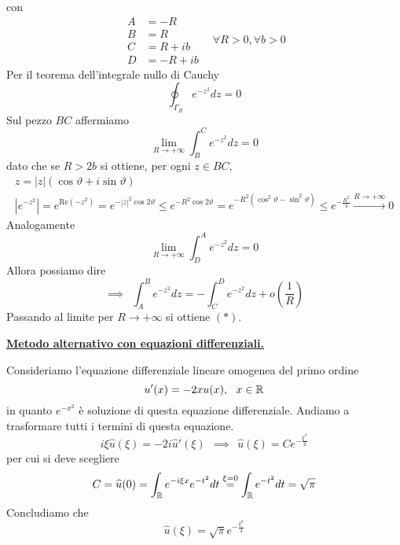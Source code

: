 con
\begin{equation*}
\begin{aligned}
A & =-R\\
B & =R\\
C & =R+ib\\
D & =-R+ib
\end{aligned} \ \ \ \ \forall R >0,\forall b >0
\end{equation*}
Per il teorema dell'integrale nullo di Cauchy
\begin{equation*}
\oint _{\Gamma _{R}} e^{-z^{2}} dz=0
\end{equation*}
Sul pezzo $BC$ affermiamo
\begin{equation*}
\lim\limits _{R\rightarrow +\infty }\int ^{C}_{B} e^{-z^{2}} dz=0
\end{equation*}
dato che se $R >2b$ si ottiene, per ogni $z\in BC$,
\begin{gather*}
z=| z| (\cos \vartheta +i\sin \vartheta )\\
\left| e^{-z^{2}}\right| =e^{\mathrm{Re}\left( -z^{2}\right)} =e^{-| z| ^{2}\cos 2\vartheta } \leqslant e^{-R^{2}\cos 2\vartheta } =e^{-R^{2}\left(\cos^{2} \vartheta -\sin^{2} \vartheta \right)} \leqslant e^{-\frac{R^{2}}{4}}\xrightarrow{R\rightarrow +\infty } 0
\end{gather*}
Analogamente
\begin{equation*}
\lim\limits _{R\rightarrow +\infty }\int ^{A}_{D} e^{-z^{2}} dz=0
\end{equation*}
Allora possiamo dire
\begin{equation*}
\implies \ \ \int ^{B}_{A} e^{-z^{2}} dz=-\int ^{D}_{C} e^{-z^{2}} dz+o\left(\frac{1}{R}\right)
\end{equation*}
Passando al limite per $R\rightarrow +\infty $ si ottiene $( *)$.



\underline{\textbf{Metodo alternativo con equazioni differenziali.}}

Consideriamo l'equazione differenziale lineare omogenea del primo ordine
\begin{equation*}
u'( x) =-2xu( x) ,\ \ x\in \mathbb{R} 
\end{equation*}
in quanto $e^{-x^{2}}$ è soluzione di questa equazione differenziale. Andiamo a trasformare tutti i termini di questa equazione.
\begin{equation*}
i\xi \hat{u}( \xi ) =-2i\hat{u} '( \xi ) \ \ \implies \ \ \hat{u}( \xi ) =Ce^{-\frac{\xi ^{2}}{4}}
\end{equation*}
per cui si deve scegliere
\begin{equation*}
C=\widehat{u}( 0) =\int _{\mathbb{R} } e^{-i\xi x} e^{-t^{2}} dt\overset{\xi =0}{=}\int _{\mathbb{R} } e^{-t^{2}} dt=\sqrt{\pi }
\end{equation*}
Concludiamo che
\begin{equation*}
\boxed{\hat{u}( \xi ) =\sqrt{\pi } e^{-\frac{\xi ^{2}}{4}}}
\end{equation*}
\Soluzione

